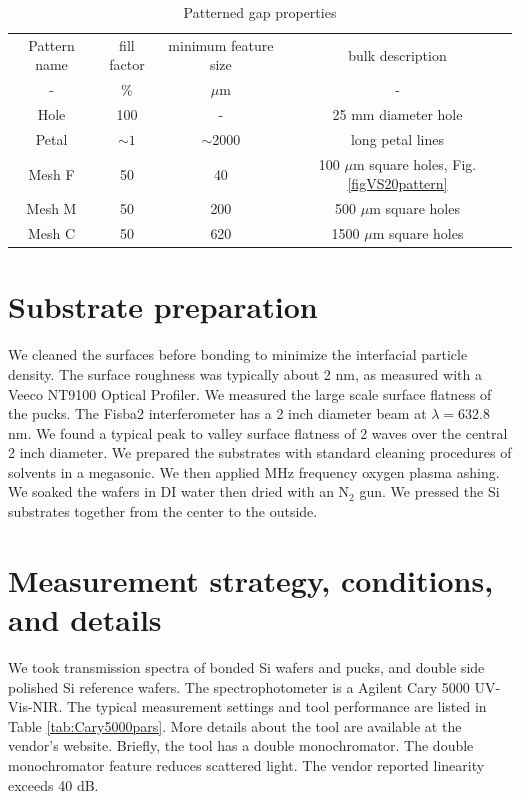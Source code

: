 \documentclass[osajnl,preprint,showpacs,superscriptaddress,12pt]{revtex4-1} %
\begin{document}
\begin{table}[h!]
\caption{Patterned gap properties \label{tabPatternFills}}
\begin{center}
    \begin{tabular}{ c c c c }
    \hline
    Pattern name & fill factor & minimum feature size & bulk description \\ 
    - & \% & $\mu$m & - \\ 
    \hline
    Hole & 100 & - & 25 mm diameter hole \\     
    Petal & $\sim1$ & $\sim$2000 & long petal lines \\         
    Mesh F & 50 & 40 &  100 $\mu$m square holes, Fig. \ref{figVS20pattern}\\ 
    Mesh M & 50 & 200 &  500 $\mu$m square holes\\ 
    Mesh C & 50 & 620 &  1500 $\mu$m square holes\\     
        \hline
    \end{tabular}
\end{center}
\end{table}

\section{Substrate preparation}
We cleaned the surfaces before bonding to minimize the interfacial particle density.  The surface roughness was typically about 2 nm, as measured with a Veeco NT9100 Optical Profiler.  We measured the large scale surface flatness of the pucks.  The Fisba2 interferometer has a 2 inch diameter beam at $\lambda=$632.8 nm.  We found a typical peak to valley surface flatness of 2 waves over the central 2 inch diameter.  We prepared the substrates with standard cleaning procedures of solvents in a megasonic.  We then applied MHz frequency oxygen plasma ashing.  We soaked the wafers in DI water then dried with an N$_2$ gun.  We pressed the Si substrates together from the center to the outside.


\section{Measurement strategy, conditions, and details}
We took transmission spectra of bonded Si wafers and pucks, and double side polished Si reference wafers. The spectrophotometer is a Agilent Cary 5000 UV-Vis-NIR.  The typical measurement settings and tool performance are listed in Table \ref{tab:Cary5000pars}.  More details about the tool are available at the vendor's website.  Briefly, the tool has a double monochromator.  The double monochromator feature reduces scattered light.  The vendor reported linearity exceeds 40 dB.  
\end{document}
